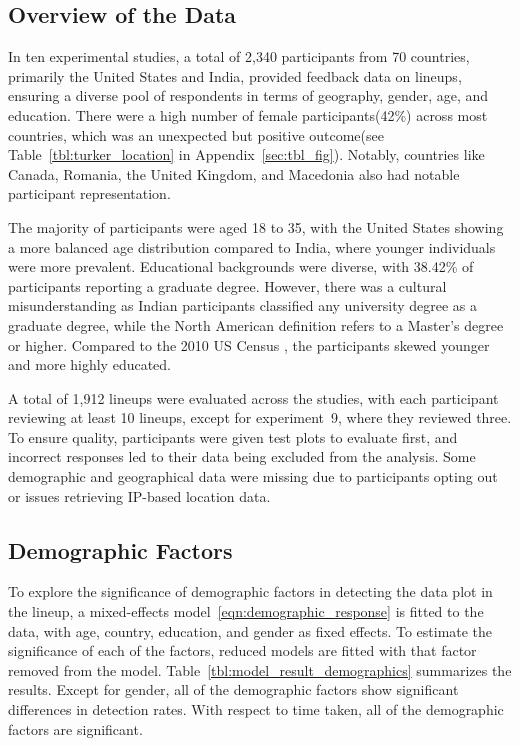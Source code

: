 \documentclass[10pt]{article}\usepackage[]{graphicx}\usepackage[]{xcolor}
\begin{document}
 \subsection{Overview of the Data} In ten experimental studies, a total of 2,340 participants from 70 countries, primarily the United States and India, provided feedback data on lineups, ensuring a diverse pool of respondents in terms of geography, gender, age, and education. There were a high number of female participants(42\%) across most countries, which was an unexpected but positive outcome(see Table~\ref{tbl:turker_location} in Appendix~\ref{sec:tbl_fig}). Notably, countries like Canada, Romania, the United Kingdom, and Macedonia also had notable participant representation.

The majority of participants were aged 18 to 35, with the United States showing a more balanced age distribution compared to India, where younger individuals were more prevalent. Educational backgrounds were diverse, with 38.42\% of participants reporting a graduate degree. However, there was a cultural misunderstanding as Indian participants classified any university degree as a graduate degree, while the North American definition refers to a Master’s degree or higher. Compared to the 2010 US Census \cite{census}, the participants skewed younger and more highly educated.

A total of 1,912 lineups were evaluated across the studies, with each participant reviewing at least 10 lineups, except for experiment~9, where they reviewed three. To ensure quality, participants were given test plots to evaluate first, and incorrect responses led to their data being excluded from the analysis. Some demographic and geographical data were missing due to participants opting out or issues retrieving IP-based location data.


\subsection{Demographic Factors} 

To explore the significance of demographic factors in detecting the data plot in the lineup, a mixed-effects model~\eqref{eqn:demographic_response} is fitted to the data, with age, country, education, and gender as fixed effects. To estimate the significance of each of the factors, reduced models are fitted with that factor removed from the model. Table~\ref{tbl:model_result_demographics} summarizes the results. Except for gender, all of the demographic factors show significant differences in  detection rates.  With respect to time taken, all of the demographic factors are significant. 
\end{document}
